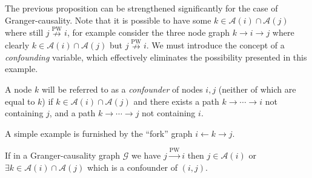 \documentclass[12pt]{article}
\def\pwgc{\overset{\text{PW}}{\rightarrow}}  %
\def\npwgc{\overset{\text{PW}}{\nrightarrow}}  %
\def\gcg{\mathcal{G}}  %
\newcommand{\anc}[1]{\mathcal{A}(#1)}  %
\newcommand{\gcgpath}[2]{#1 \rightarrow \cdots \rightarrow #2}  %
\begin{document}
The previous proposition can be strengthened significantly for the
case of Granger-causality.  Note that it is possible to have some
$k \in \anc{i} \cap \anc{j}$ where still $j \npwgc i$, for example
consider the three node graph $k \rightarrow i \rightarrow j$ where
clearly $k \in \anc{i}\cap\anc{j}$ but $j \npwgc i$.  We must
introduce the concept of a \textit{confounding} variable, which
effectively eliminates the possibility presented in this example.

\begin{definition}[Confounder]
  A node $k$ will be referred to as a \textit{confounder} of nodes
  $i, j$ (neither of which are equal to $k$) if
  $k \in \anc{i} \cap \anc{j}$ and there exists a path
  $\gcgpath{k}{i}$ not containing $j$, and a path $\gcgpath{k}{j}$
  not containing $i$.

  A simple example is furnished by the ``fork'' graph
  $i \leftarrow k \rightarrow j$.
\end{definition}

\begin{proposition}
  If in a Granger-causality graph $\gcg$ we have $j \pwgc i$ then
  $j \in \anc{i}$ or $\exists k \in \anc{i} \cap\anc{j}$ which is a
  confounder of $(i, j)$.
\end{proposition}
\end{document}
